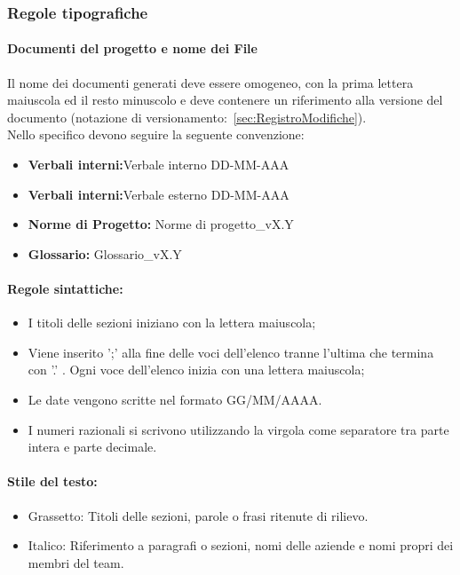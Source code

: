 \documentclass{article}
\begin{document}
    \subsubsection{Regole tipografiche}
    \paragraph*{Documenti del progetto e nome dei File}\label{sec:NomeFile}
    Il nome dei documenti generati deve essere omogeneo, con la prima lettera maiuscola ed il resto minuscolo e deve contenere un riferimento alla versione del documento (notazione di versionamento:~\ref{sec:RegistroModifiche}).\\
    Nello specifico devono seguire la seguente convenzione:
    \begin{itemize}
        \item \textbf{Verbali interni:}Verbale interno DD-MM-AAA
        \item \textbf{Verbali interni:}Verbale esterno DD-MM-AAA
        \item \textbf{Norme di Progetto:} Norme di progetto\_vX.Y
        \item \textbf{Glossario:} Glossario\_vX.Y
    \end{itemize}
    
    \paragraph*{Regole sintattiche:}
    \begin{itemize}
        \item I titoli delle sezioni iniziano con la lettera maiuscola;
         \item Viene inserito ';' alla fine delle voci dell'elenco tranne l'ultima che termina con '.' . Ogni voce dell'elenco inizia con una lettera maiuscola;
        \item  Le date vengono scritte nel formato GG/MM/AAAA.
        \item  I numeri razionali si scrivono utilizzando la virgola come separatore tra parte intera e parte decimale.
        \end{itemize}
      \paragraph*{Stile del testo:}
      \begin{itemize}
\item Grassetto: Titoli delle sezioni, parole o frasi ritenute di rilievo. 
\item Italico: Riferimento a paragrafi o sezioni, nomi delle aziende e nomi propri dei membri del team.
    \end{itemize}
\end{document}
